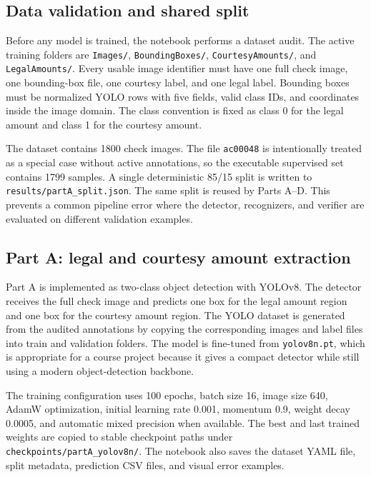 \documentclass{article}
\begin{document}
\subsection{Data validation and shared split}

Before any model is trained, the notebook performs a dataset audit. The active training folders are \texttt{Images/}, \texttt{BoundingBoxes/}, \texttt{CourtesyAmounts/}, and \texttt{LegalAmounts/}. Every usable image identifier must have one full check image, one bounding-box file, one courtesy label, and one legal label. Bounding boxes must be normalized YOLO rows with five fields, valid class IDs, and coordinates inside the image domain. The class convention is fixed as class 0 for the legal amount and class 1 for the courtesy amount.

The dataset contains 1800 check images. The file \texttt{ac00048} is intentionally treated as a special case without active annotations, so the executable supervised set contains 1799 samples. A single deterministic 85/15 split is written to \texttt{results/partA\_split.json}. The same split is reused by Parts A--D. This prevents a common pipeline error where the detector, recognizers, and verifier are evaluated on different validation examples.

\subsection{Part A: legal and courtesy amount extraction}

Part A is implemented as two-class object detection with YOLOv8. The detector receives the full check image and predicts one box for the legal amount region and one box for the courtesy amount region. The YOLO dataset is generated from the audited annotations by copying the corresponding images and label files into train and validation folders. The model is fine-tuned from \texttt{yolov8n.pt}, which is appropriate for a course project because it gives a compact detector while still using a modern object-detection backbone.

The training configuration uses 100 epochs, batch size 16, image size 640, AdamW optimization, initial learning rate 0.001, momentum 0.9, weight decay 0.0005, and automatic mixed precision when available. The best and last trained weights are copied to stable checkpoint paths under \texttt{checkpoints/partA\_yolov8n/}. The notebook also saves the dataset YAML file, split metadata, prediction CSV files, and visual error examples.
\end{document}
